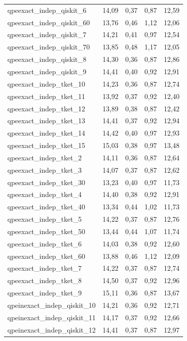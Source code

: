 \begin{longtable}{lrrrr}
qpeexact\_indep\_qiskit\_6 & 14,09 & 0,37 & 0,87 & 12,59 \\
qpeexact\_indep\_qiskit\_60 & 13,76 & 0,46 & 1,12 & 12,06 \\
qpeexact\_indep\_qiskit\_7 & 14,21 & 0,41 & 0,97 & 12,54 \\
qpeexact\_indep\_qiskit\_70 & 13,85 & 0,48 & 1,17 & 12,05 \\
qpeexact\_indep\_qiskit\_8 & 14,30 & 0,36 & 0,87 & 12,86 \\
qpeexact\_indep\_qiskit\_9 & 14,41 & 0,40 & 0,92 & 12,91 \\
qpeexact\_indep\_tket\_10 & 14,23 & 0,36 & 0,87 & 12,74 \\
qpeexact\_indep\_tket\_11 & 13,92 & 0,37 & 0,92 & 12,40 \\
qpeexact\_indep\_tket\_12 & 13,89 & 0,38 & 0,87 & 12,42 \\
qpeexact\_indep\_tket\_13 & 14,41 & 0,37 & 0,92 & 12,94 \\
qpeexact\_indep\_tket\_14 & 14,42 & 0,40 & 0,97 & 12,93 \\
qpeexact\_indep\_tket\_15 & 15,03 & 0,38 & 0,97 & 13,48 \\
qpeexact\_indep\_tket\_2 & 14,11 & 0,36 & 0,87 & 12,64 \\
qpeexact\_indep\_tket\_3 & 14,07 & 0,37 & 0,87 & 12,62 \\
qpeexact\_indep\_tket\_30 & 13,23 & 0,40 & 0,97 & 11,73 \\
qpeexact\_indep\_tket\_4 & 14,40 & 0,38 & 0,92 & 12,91 \\
qpeexact\_indep\_tket\_40 & 13,34 & 0,44 & 1,02 & 11,73 \\
qpeexact\_indep\_tket\_5 & 14,22 & 0,37 & 0,87 & 12,76 \\
qpeexact\_indep\_tket\_50 & 13,44 & 0,44 & 1,07 & 11,74 \\
qpeexact\_indep\_tket\_6 & 14,03 & 0,38 & 0,92 & 12,60 \\
qpeexact\_indep\_tket\_60 & 13,88 & 0,46 & 1,12 & 12,09 \\
qpeexact\_indep\_tket\_7 & 14,22 & 0,37 & 0,87 & 12,74 \\
qpeexact\_indep\_tket\_8 & 14,50 & 0,37 & 0,92 & 12,96 \\
qpeexact\_indep\_tket\_9 & 15,11 & 0,36 & 0,87 & 13,67 \\
qpeinexact\_indep\_qiskit\_10 & 14,21 & 0,36 & 0,92 & 12,71 \\
qpeinexact\_indep\_qiskit\_11 & 14,17 & 0,37 & 0,92 & 12,66 \\
qpeinexact\_indep\_qiskit\_12 & 14,41 & 0,37 & 0,87 & 12,97 \\

\end{longtable}
